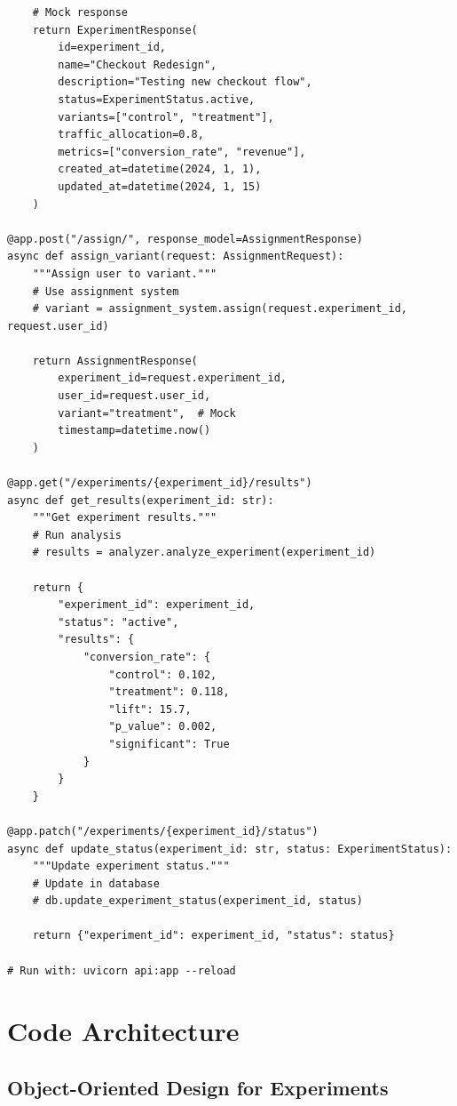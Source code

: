 \begin{lstlisting}
    # Mock response
    return ExperimentResponse(
        id=experiment_id,
        name="Checkout Redesign",
        description="Testing new checkout flow",
        status=ExperimentStatus.active,
        variants=["control", "treatment"],
        traffic_allocation=0.8,
        metrics=["conversion_rate", "revenue"],
        created_at=datetime(2024, 1, 1),
        updated_at=datetime(2024, 1, 15)
    )

@app.post("/assign/", response_model=AssignmentResponse)
async def assign_variant(request: AssignmentRequest):
    """Assign user to variant."""
    # Use assignment system
    # variant = assignment_system.assign(request.experiment_id, request.user_id)

    return AssignmentResponse(
        experiment_id=request.experiment_id,
        user_id=request.user_id,
        variant="treatment",  # Mock
        timestamp=datetime.now()
    )

@app.get("/experiments/{experiment_id}/results")
async def get_results(experiment_id: str):
    """Get experiment results."""
    # Run analysis
    # results = analyzer.analyze_experiment(experiment_id)

    return {
        "experiment_id": experiment_id,
        "status": "active",
        "results": {
            "conversion_rate": {
                "control": 0.102,
                "treatment": 0.118,
                "lift": 15.7,
                "p_value": 0.002,
                "significant": True
            }
        }
    }

@app.patch("/experiments/{experiment_id}/status")
async def update_status(experiment_id: str, status: ExperimentStatus):
    """Update experiment status."""
    # Update in database
    # db.update_experiment_status(experiment_id, status)

    return {"experiment_id": experiment_id, "status": status}

# Run with: uvicorn api:app --reload
\end{lstlisting}

\section{Code Architecture}

\subsection{Object-Oriented Design for Experiments}

